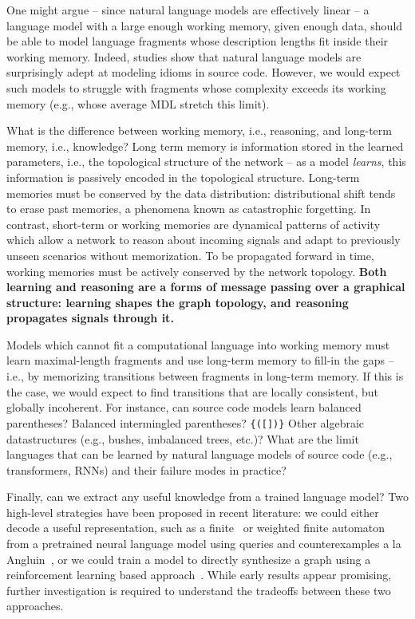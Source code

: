 \documentclass[12pt]{article}
\begin{document}
One might argue -- since natural language models are effectively linear -- a language model with a large enough working memory, given enough data, should be able to model language fragments whose description lengths fit inside their working memory. Indeed, studies show that natural language models are surprisingly adept at modeling idioms in source code. However, we would expect such models to struggle with fragments whose complexity exceeds its working memory (e.g., whose average MDL stretch this limit).

What is the difference between working memory, i.e., reasoning, and long-term memory, i.e., knowledge? Long term memory is information stored in the learned parameters, i.e., the topological structure of the network -- as a model \textit{learns}, this information is passively encoded in the topological structure. Long-term memories must be conserved by the data distribution: distributional shift tends to erase past memories, a phenomena known as catastrophic forgetting. In contrast, short-term or working memories are dynamical patterns of activity which allow a network to reason about incoming signals and adapt to previously unseen scenarios without memorization. To be propagated forward in time, working memories must be actively conserved by the network topology. \textbf{Both learning and reasoning are a forms of message passing over a graphical structure: learning shapes the graph topology, and reasoning propagates signals through it.}

Models which cannot fit a computational language into working memory must learn maximal-length fragments and use long-term memory to fill-in the gaps -- i.e., by memorizing transitions between fragments in long-term memory. If this is the case, we would expect to find transitions that are locally consistent, but globally incoherent. For instance, can source code models learn balanced parentheses? Balanced intermingled parentheses? \texttt{\{([])\}} Other algebraic datastructures (e.g., bushes, imbalanced trees, etc.)? What are the limit languages that can be learned by natural language models of source code (e.g., transformers, RNNs) and their failure modes in practice?

Finally, can we extract any useful knowledge from a trained language model? Two high-level strategies have been proposed in recent literature: we could either decode a useful representation, such as a finite~\cite{weiss2018extracting} or weighted finite automaton~\cite{weiss2019learning} from a pretrained neural language model using queries and counterexamples a la Angluin~\cite{angluin1987learning}, or we could train a model to directly synthesize a graph using a reinforcement learning based approach~\cite{johnson2020learning}. While early results appear promising, further investigation is required to understand the tradeoffs between these two approaches.
\end{document}
